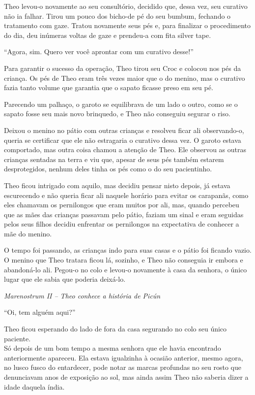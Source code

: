 Theo levou-o novamente ao seu consultório, decidido que, dessa vez, seu
curativo não ia falhar. Tirou um pouco dos bicho-de pé do seu bumbum,
fechando o tratamento com gaze. Tratou novamente seus pés e, para
finalizar o procedimento do dia, deu inúmeras voltas de gaze e prendeu-a
com fita silver tape.

``Agora, sim. Quero ver você aprontar com um curativo desse!''

Para garantir o sucesso da operação, Theo tirou seu Croc e colocou nos
pés da criança. Os pés de Theo eram três vezes maior que o do menino,
mas o curativo fazia tanto volume que garantia que o sapato ficasse
preso em seu pé.

Parecendo um palhaço, o garoto se equilibrava de um lado o outro, como
se o sapato fosse seu mais novo brinquedo, e Theo não conseguiu segurar
o riso.

Deixou o menino no pátio com outras crianças e resolveu ficar ali
observando-o, queria se certificar que ele não estragaria o curativo
dessa vez. O garoto estava comportado, mas outra coisa chamou a atenção
de Theo. Ele observou as outras crianças sentadas na terra e viu que,
apesar de seus pés também estarem desprotegidos, nenhum deles tinha os
pés como o do seu pacientinho.

Theo ficou intrigado com aquilo, mas decidiu pensar nisto depois, já
estava escurecendo e não queria ficar ali naquele horário para evitar os
carapanãs, como eles chamavam os pernilongos que eram muitos por ali,
mas, quando percebeu que as mães das crianças passavam pelo pátio,
faziam um sinal e eram seguidas pelos seus filhos decidiu enfrentar os
pernilongos na expectativa de conhecer a mãe do menino.

O tempo foi passando, as crianças indo para suas casas e o pátio foi
ficando vazio. O menino que Theo tratara ficou lá, sozinho, e Theo não
conseguia ir embora e abandoná-lo ali. Pegou-o no colo e levou-o
novamente à casa da senhora, o único lugar que ele sabia que poderia
deixá-lo.

\asterisc

\emph{Marenostrum II -- Theo conhece a história de Picún}

``Oi, tem alguém aqui?''

Theo ficou esperando do lado de fora da casa segurando no colo seu único
paciente.\\
Só depois de um bom tempo a mesma senhora que ele havia encontrado
anteriormente apareceu. Ela estava igualzinha à ocasião anterior, mesmo
agora, no lusco fusco do entardecer, pode notar as marcas profundas no
seu rosto que denunciavam anos de exposição ao sol, mas ainda assim Theo
não saberia dizer a idade daquela índia.

